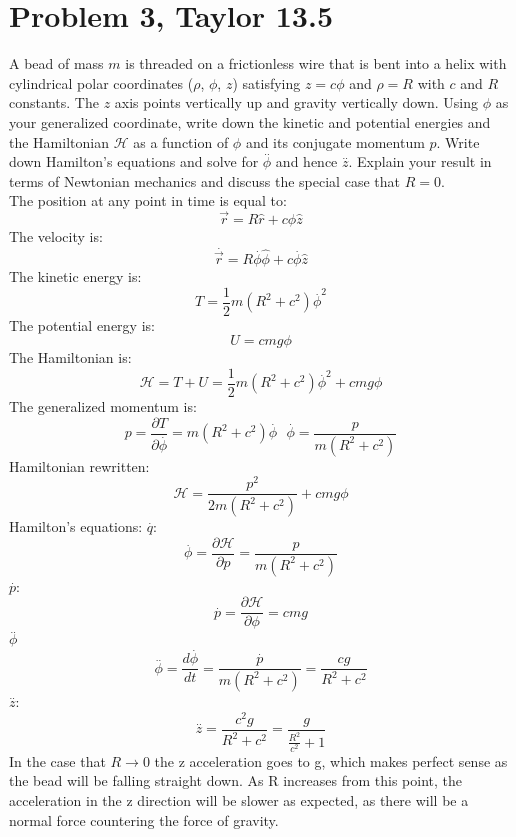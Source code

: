\documentclass[a4paper,12pt]{article}
\newcommand{\V}[1]{\ensuremath{\vec{#1}}}
\newcommand{\F}[2]{\ensuremath{\frac{#1}{#2}}}
\newcommand{\Q}[1]{\newpage \section*{#1}}
\newcommand{\acc}[1]{\overset{..}{#1}}
\newcommand{\vel}[1]{\overset{.}{#1}}
\newcommand{\prt}[2]{\frac{\partial#1}{\partial#2}}
\begin{document}
\Q{Problem 3, Taylor 13.5}
A bead of mass $m$ is threaded on a frictionless wire that is bent into a helix with cylindrical polar coordinates ($\rho$, $\phi$, $z$) satisfying $z = c\phi$ and $\rho = R$ with $c$ and $R$ constants. The $z$ axis points vertically up and gravity vertically down.  Using $\phi$ as your generalized coordinate, write down the kinetic and potential energies and the Hamiltonian $\mathcal{H}$ as a function of $\phi$ and its conjugate momentum $p$. Write down Hamilton's equations and solve for $\acc{\phi}$ and hence $\acc{z}$.  Explain your result in terms of Newtonian mechanics and discuss the special case that $R=0$.\\
The position at any point in time is equal to:
\[\V{r}=R\hat{r}+c\phi\hat{z}\]
The velocity is:
\[\vel{\V{r}}=R\vel{\phi}\hat{\phi}+c\vel{\phi}\hat{z}\]
The kinetic energy is:
\[T=\F{1}{2}m(R^2+c^2)\vel{\phi}^2\]
The potential energy is:
\[U=cmg\phi\]
The Hamiltonian is:
\[\mathcal{H}=T+U=\F{1}{2}m(R^2+c^2)\vel{\phi}^2+cmg\phi\]
The generalized momentum is:
\[p=\prt{T}{\vel{\phi}}=m(R^2+c^2)\vel{\phi}~~~\vel{\phi}=\F{p}{m(R^2+c^2)}\]
Hamiltonian rewritten:
\[\mathcal{H}=\F{p^2}{2m(R^2+c^2)}+cmg\phi\]
Hamilton's equations:
$\vel{q}$:
\[\vel{\phi}=\prt{\mathcal{H}}{p}=\F{p}{m(R^2+c^2)}\]
$\vel{p}$:
\[\vel{p}=\prt{\mathcal{H}}{\phi}=cmg\]
$\acc{\phi}$
\[\acc{\phi}=\F{d\vel{\phi}}{dt}=\F{\vel{p}}{m(R^2+c^2)}=\F{cg}{R^2+c^2}\]
$\acc{z}$:
\[\acc{z}=\F{c^2g}{R^2+c^2}=\F{g}{\F{R^2}{c^2}+1}\]
In the case that $R\rightarrow0$ the z acceleration goes to g, which makes perfect sense as the bead will be falling straight down. As R increases from this point, the acceleration in the z direction will be slower as expected, as there will be a normal force countering the force of gravity.
\end{document}
